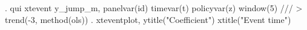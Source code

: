 . qui xtevent y_jump_m, panelvar(id) timevar(t) policyvar(z) window(5) ///
>         trend(-3, method(ols))
{\smallskip}
. xteventplot, ytitle("Coefficient") xtitle("Event time")

